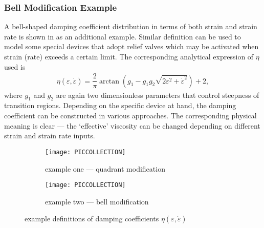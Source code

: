 \subsubsection{Bell Modification Example}
A bell-shaped damping coefficient distribution in terms of both strain and strain rate is shown in  as an additional example. Similar definition can be used to model some special devices that adopt relief valves which may be activated when strain (rate) exceeds a certain limit. The corresponding analytical expression of $\eta$ used is
\begin{gather}
\eta\left(\varepsilon,\dot\varepsilon\right)=\dfrac{2}{\pi}\arctan\left(g_1-g_1g_2\sqrt{2\varepsilon^2+\dot\varepsilon^2}\right)+2,
\end{gather}
where $g_1$ and $g_2$ are again two dimensionless parameters that control steepness of transition regions. Depending on the specific device at hand, the damping coefficient can be constructed in various approaches. The corresponding physical meaning is clear --- the `effective' viscosity can be changed depending on different strain and strain rate inputs.
\begin{figure}[hbt]
\scriptsize\centering
\begin{subfigure}[b]{.49\textwidth}\centering
\texttt{[image: PICCOLLECTION]}
\caption{example one --- quadrant modification}\label{fig:eta_example1}
\end{subfigure}\hfill
\begin{subfigure}[b]{.49\textwidth}\centering
\texttt{[image: PICCOLLECTION]}
\caption{example two --- bell modification}\label{fig:eta_example2}
\end{subfigure}
\caption{example definitions of damping coefficients $\eta\left(\varepsilon,\dot\varepsilon\right)$}\label{fig:eta_example}
\end{figure}
